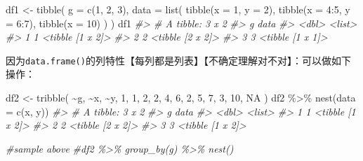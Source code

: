 \documentclass[
]{book}
\newenvironment{Shaded}{\begin{snugshade}}{\end{snugshade}}
\newcommand{\AttributeTok}[1]{\textcolor[rgb]{0.77,0.63,0.00}{#1}}
\newcommand{\CommentTok}[1]{\textcolor[rgb]{0.56,0.35,0.01}{\textit{#1}}}
\newcommand{\ConstantTok}[1]{\textcolor[rgb]{0.00,0.00,0.00}{#1}}
\newcommand{\DecValTok}[1]{\textcolor[rgb]{0.00,0.00,0.81}{#1}}
\newcommand{\FunctionTok}[1]{\textcolor[rgb]{0.00,0.00,0.00}{#1}}
\newcommand{\NormalTok}[1]{#1}
\newcommand{\OtherTok}[1]{\textcolor[rgb]{0.56,0.35,0.01}{#1}}
\newcommand{\SpecialCharTok}[1]{\textcolor[rgb]{0.00,0.00,0.00}{#1}}
\begin{document}
\begin{Shaded}
\begin{Highlighting}[]
\NormalTok{df1 }\OtherTok{\textless{}{-}} \FunctionTok{tibble}\NormalTok{(}
  \AttributeTok{g =} \FunctionTok{c}\NormalTok{(}\DecValTok{1}\NormalTok{, }\DecValTok{2}\NormalTok{, }\DecValTok{3}\NormalTok{),}
  \AttributeTok{data =} \FunctionTok{list}\NormalTok{(}
    \FunctionTok{tibble}\NormalTok{(}\AttributeTok{x =} \DecValTok{1}\NormalTok{, }\AttributeTok{y =} \DecValTok{2}\NormalTok{),}
    \FunctionTok{tibble}\NormalTok{(}\AttributeTok{x =} \DecValTok{4}\SpecialCharTok{:}\DecValTok{5}\NormalTok{, }\AttributeTok{y =} \DecValTok{6}\SpecialCharTok{:}\DecValTok{7}\NormalTok{),}
    \FunctionTok{tibble}\NormalTok{(}\AttributeTok{x =} \DecValTok{10}\NormalTok{)}
\NormalTok{  )}
\NormalTok{)}
\NormalTok{df1}
\CommentTok{\#\textgreater{} \# A tibble: 3 x 2}
\CommentTok{\#\textgreater{}       g data            }
\CommentTok{\#\textgreater{}   \textless{}dbl\textgreater{} \textless{}list\textgreater{}          }
\CommentTok{\#\textgreater{} 1     1 \textless{}tibble [1 x 2]\textgreater{}}
\CommentTok{\#\textgreater{} 2     2 \textless{}tibble [2 x 2]\textgreater{}}
\CommentTok{\#\textgreater{} 3     3 \textless{}tibble [1 x 1]\textgreater{}}
\end{Highlighting}
\end{Shaded}

因为\texttt{data.frame()}的列特性【每列都是列表】【不确定理解对不对】：可以做如下操作：

\begin{Shaded}
\begin{Highlighting}[]
\NormalTok{df2 }\OtherTok{\textless{}{-}} \FunctionTok{tribble}\NormalTok{(}
  \SpecialCharTok{\textasciitilde{}}\NormalTok{g, }\SpecialCharTok{\textasciitilde{}}\NormalTok{x, }\SpecialCharTok{\textasciitilde{}}\NormalTok{y,}
   \DecValTok{1}\NormalTok{,  }\DecValTok{1}\NormalTok{,  }\DecValTok{2}\NormalTok{,}
   \DecValTok{2}\NormalTok{,  }\DecValTok{4}\NormalTok{,  }\DecValTok{6}\NormalTok{,}
   \DecValTok{2}\NormalTok{,  }\DecValTok{5}\NormalTok{,  }\DecValTok{7}\NormalTok{,}
   \DecValTok{3}\NormalTok{, }\DecValTok{10}\NormalTok{,  }\ConstantTok{NA}
\NormalTok{)}
\NormalTok{df2 }\SpecialCharTok{\%\textgreater{}\%} \FunctionTok{nest}\NormalTok{(}\AttributeTok{data =} \FunctionTok{c}\NormalTok{(x, y))}
\CommentTok{\#\textgreater{} \# A tibble: 3 x 2}
\CommentTok{\#\textgreater{}       g data            }
\CommentTok{\#\textgreater{}   \textless{}dbl\textgreater{} \textless{}list\textgreater{}          }
\CommentTok{\#\textgreater{} 1     1 \textless{}tibble [1 x 2]\textgreater{}}
\CommentTok{\#\textgreater{} 2     2 \textless{}tibble [2 x 2]\textgreater{}}
\CommentTok{\#\textgreater{} 3     3 \textless{}tibble [1 x 2]\textgreater{}}

\CommentTok{\#sample above}
\CommentTok{\#df2 \%\textgreater{}\% group\_by(g) \%\textgreater{}\% nest()}
\end{Highlighting}
\end{Shaded}
\end{document}
